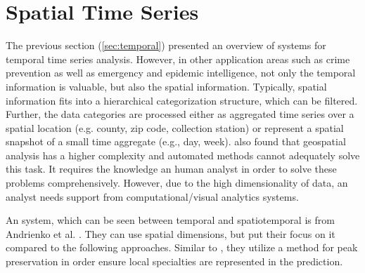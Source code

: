 \documentclass[electronic]{vgtc}             %
\begin{document}
\section{Spatial Time Series\label{sec:spatiotemp}}
The previous section (\autoref{sec:temporal}) presented an overview of systems for temporal time series analysis. 
However, in other application areas such as crime prevention as well as emergency and epidemic intelligence, not only the temporal information is valuable, but also the spatial information.
Typically, spatial information fits into a hierarchical categorization structure, which can be filtered.
Further, the data categories are processed either as aggregated time series over a spatial location (e.g. county, zip code, collection station) or represent a spatial snapshot of a small time aggregate (e.g., day, week).
\cite{Andrienko:2008, Andrienko:2010:Space} also found that geospatial analysis has a higher complexity and automated methods cannot adequately solve this task. 
It requires the knowledge an human analyst in order to solve these problems comprehensively.
However, due to the high dimensionality of data, an analyst needs support from computational/visual analytics systems.

An system, which can be seen between temporal and spatiotemporal is from Andrienko et al. \cite{Andrienko:2010}. 
They can use spatial dimensions, but put their focus on it compared to the following approaches.
Similar to \cite{Hao:2009,Hao:2011,Hao:2012}, they utilize a method for peak preservation in order ensure local specialties are represented in the prediction. 
\end{document}
